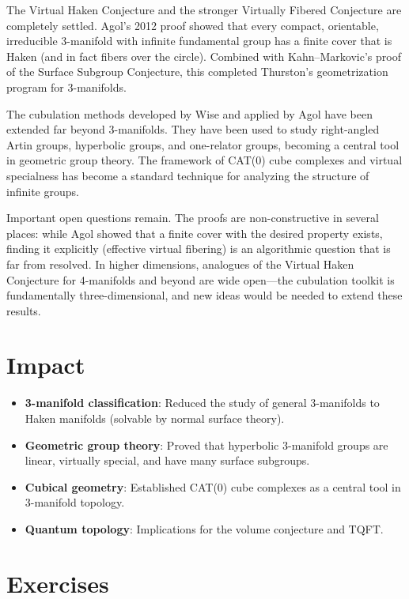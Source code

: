 The Virtual Haken Conjecture and the stronger Virtually Fibered Conjecture are completely settled. Agol's 2012 proof showed that every compact, orientable, irreducible 3-manifold with infinite fundamental group has a finite cover that is Haken (and in fact fibers over the circle). Combined with Kahn--Markovic's proof of the Surface Subgroup Conjecture, this completed Thurston's geometrization program for 3-manifolds.

The cubulation methods developed by Wise and applied by Agol have been extended far beyond 3-manifolds. They have been used to study right-angled Artin groups, hyperbolic groups, and one-relator groups, becoming a central tool in geometric group theory. The framework of CAT(0) cube complexes and virtual specialness has become a standard technique for analyzing the structure of infinite groups.

Important open questions remain. The proofs are non-constructive in several places: while Agol showed that a finite cover with the desired property exists, finding it explicitly (effective virtual fibering) is an algorithmic question that is far from resolved. In higher dimensions, analogues of the Virtual Haken Conjecture for 4-manifolds and beyond are wide open---the cubulation toolkit is fundamentally three-dimensional, and new ideas would be needed to extend these results.

\section{Impact}
\begin{itemize}
\item \textbf{3-manifold classification}: Reduced the study of general 3-manifolds to Haken manifolds (solvable by normal surface theory).
\item \textbf{Geometric group theory}: Proved that hyperbolic 3-manifold groups are linear, virtually special, and have many surface subgroups.
\item \textbf{Cubical geometry}: Established CAT(0) cube complexes as a central tool in 3-manifold topology.
\item \textbf{Quantum topology}: Implications for the volume conjecture and TQFT.
\end{itemize}

\section{Exercises}

